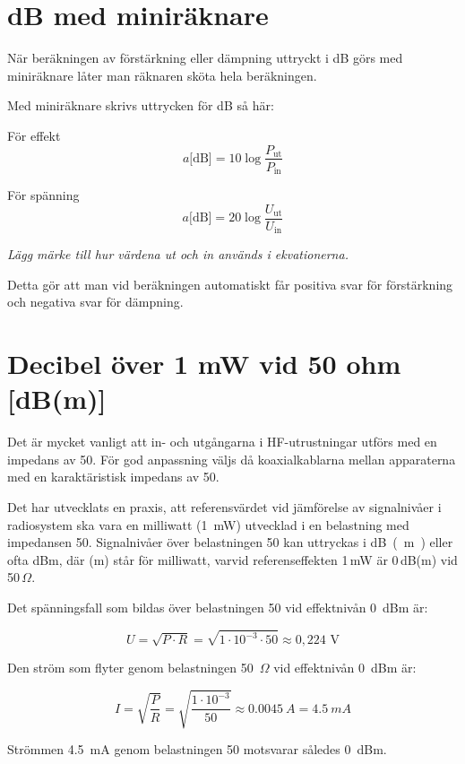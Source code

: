 \vspace{\baselineskip}

\section{dB med miniräknare}

När beräkningen av förstärkning eller dämpning uttryckt i dB görs med
miniräknare låter man räknaren sköta hela beräkningen.

Med miniräknare skrivs uttrycken för dB så här:

För effekt 
\[   a\text{[dB]} = 10\log \dfrac{P_\text{ut}}{P_\text{in}}   \]

För spänning 
\[   a\text{[dB]} = 20\log \dfrac{U_\text{ut}}{U_\text{in}}   \]

\emph{Lägg märke till hur värdena ut och in används i ekvationerna.}

Detta gör att man vid beräkningen automatiskt får positiva svar för
förstärkning och negativa svar för dämpning.

\section{Decibel över 1 mW vid 50 ohm [dB(m)]}

Det är mycket vanligt att in- och utgångarna i HF-utrustningar utförs
med en impedans av \SI{50}{\Omega}.
För god anpassning väljs då koaxialkablarna mellan apparaterna med en
karaktäristisk impedans av \SI{50}{\Omega}.

Det har utvecklats en praxis, att referensvärdet vid jämförelse av signalnivåer
i radiosystem ska vara en milliwatt (\SI{1}{mW}) utvecklad i en belastning med
impedansen \SI{50}{\Omega}.
Signalnivåer över belastningen \SI{50}{\Omega} kan uttryckas i \unit{dB(m)} 
eller ofta \unit{dBm}, där (m) står för milliwatt, varvid referenseffekten 
1\,mW är 0\,dB(m) vid 50\,\(\Omega\).

Det spänningsfall som bildas över belastningen \SI{50}{\Omega} vid effektnivån
\SI{0}{dBm} är:

\[U = \sqrt{P\cdot R} = \sqrt{1\cdot 10^{-3} \cdot 50} \approx 0,224 \text{ V}\]

Den ström som flyter genom belastningen 50~\(\Omega\) vid effektnivån 
\SI{0}{dBm}
är:

\[   I = \sqrt{\frac{P}{R}} = \sqrt{\frac{1\cdot 10^{-3}}{50}} \approx 
	\SI{0,0045}{A} = \SI{4,5}{mA}   \]

Strömmen \SI{4,5}{mA} genom belastningen \SI{50}{\Omega} motsvarar således 
\SI{0}{dBm}.

